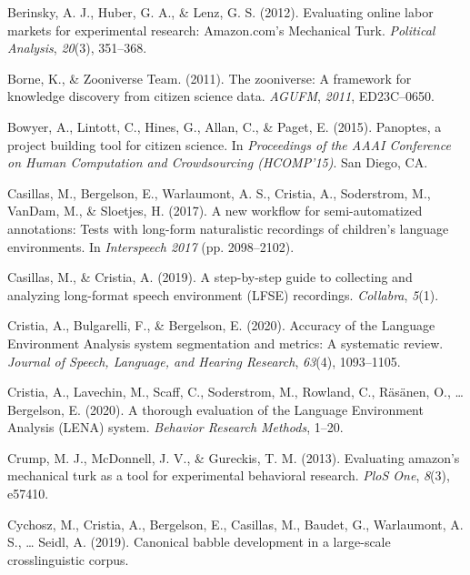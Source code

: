 \documentclass[english,,man]{apa6}
\begin{document}
\leavevmode\hypertarget{ref-berinsky2012evaluating}{}%
Berinsky, A. J., Huber, G. A., \& Lenz, G. S. (2012). Evaluating online labor markets for experimental research: Amazon.com's Mechanical Turk. \emph{Political Analysis}, \emph{20}(3), 351--368.

\leavevmode\hypertarget{ref-borne2011zooniverse}{}%
Borne, K., \& Zooniverse Team. (2011). The zooniverse: A framework for knowledge discovery from citizen science data. \emph{AGUFM}, \emph{2011}, ED23C--0650.

\leavevmode\hypertarget{ref-bowyer2015panoptes}{}%
Bowyer, A., Lintott, C., Hines, G., Allan, C., \& Paget, E. (2015). Panoptes, a project building tool for citizen science. In \emph{Proceedings of the AAAI Conference on Human Computation and Crowdsourcing (HCOMP'15)}. San Diego, CA.

\leavevmode\hypertarget{ref-casillas2017new}{}%
Casillas, M., Bergelson, E., Warlaumont, A. S., Cristia, A., Soderstrom, M., VanDam, M., \& Sloetjes, H. (2017). A new workflow for semi-automatized annotations: Tests with long-form naturalistic recordings of children's language environments. In \emph{Interspeech 2017} (pp. 2098--2102).

\leavevmode\hypertarget{ref-casillas2019step}{}%
Casillas, M., \& Cristia, A. (2019). A step-by-step guide to collecting and analyzing long-format speech environment (LFSE) recordings. \emph{Collabra}, \emph{5}(1).

\leavevmode\hypertarget{ref-cristia2020accuracy}{}%
Cristia, A., Bulgarelli, F., \& Bergelson, E. (2020). Accuracy of the Language Environment Analysis system segmentation and metrics: A systematic review. \emph{Journal of Speech, Language, and Hearing Research}, \emph{63}(4), 1093--1105.

\leavevmode\hypertarget{ref-cristia2020thorough}{}%
Cristia, A., Lavechin, M., Scaff, C., Soderstrom, M., Rowland, C., Räsänen, O., \ldots{} Bergelson, E. (2020). A thorough evaluation of the Language Environment Analysis (LENA) system. \emph{Behavior Research Methods}, 1--20.

\leavevmode\hypertarget{ref-crump2013evaluating}{}%
Crump, M. J., McDonnell, J. V., \& Gureckis, T. M. (2013). Evaluating amazon's mechanical turk as a tool for experimental behavioral research. \emph{PloS One}, \emph{8}(3), e57410.

\leavevmode\hypertarget{ref-cychosz2019canonical}{}%
Cychosz, M., Cristia, A., Bergelson, E., Casillas, M., Baudet, G., Warlaumont, A. S., \ldots{} Seidl, A. (2019). Canonical babble development in a large-scale crosslinguistic corpus.
\end{document}
